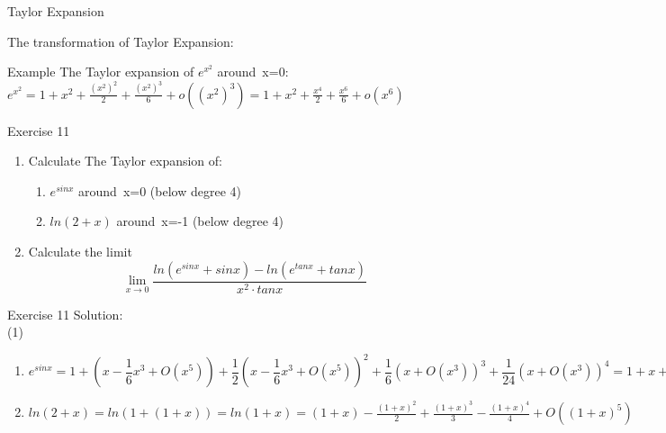 \documentclass{beamer}
\begin{document}
\begin{frame}{Taylor Expansion}
    

The transformation of Taylor Expansion:
\begin{block}{Example}
The Taylor expansion of $e^{x^2}$ around\ x=0:\\
$e^{x^2}=1+x^2+\frac{(x^2)^2}{2}+\frac{(x^2)^3}{6}+o((x^2)^3)=1+x^2+\frac{x^4}{2}+\frac{x^6}{6}+o(x^6)$
\end{block}


\end{frame}
\begin{frame}{Exercise 11}
\begin{block}{}
\begin{enumerate}
    \item Calculate The Taylor expansion of:\\
\begin{enumerate}
    \item $e^{sinx}$ around\ x=0 (below degree 4)
    \item $ln(2+x)$ around\ x=-1 (below degree 4)
\end{enumerate}
\item Calculate the limit $$\lim\limits_{x\to 0}\frac{ln(e^{sinx}+sinx)-ln(e^{tanx}+tanx)}{x^2\cdot tanx}$$
\end{enumerate}

\end{block}
    
\end{frame}
\begin{frame}{Exercise 11}
\small
    Solution:\\
    (1)\\
    \begin{enumerate}
        \item $e^{sinx}=1+(x-\dfrac{1}{6}x^3+O(x^5))+\dfrac{1}{2}(x-\dfrac{1}{6}x^3+O(x^5))^2+\dfrac{1}{6}(x+O(x^3))^3+\dfrac{1}{24}(x+O(x^3))^4=1+x+\dfrac{x^2}{2}-\dfrac{x^4}{8}+O(x^5)$
        \item $ln(2+x)=ln(1+(1+x))=ln(1+x)=(1+x)-\frac{(1+x)^2}{2}+\frac{(1+x)^3}{3}-\frac{(1+x)^4}{4}+O((1+x)^5)$
    \end{enumerate}
\end{frame}
\end{document}
